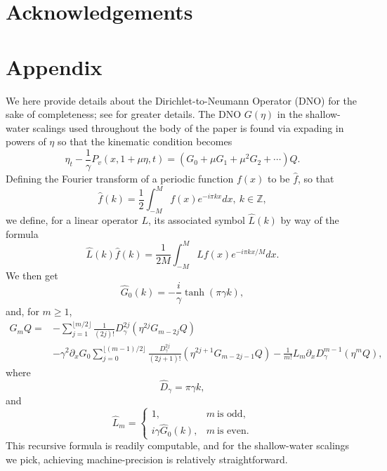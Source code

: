 \documentclass[a4paper,11pt]{article}
\newcommand{\ba}{\begin{array}}
\newcommand{\ea}{\end{array}}
\newcommand{\p}{\partial}
\begin{document}
\section*{Acknowledgements}

\section*{Appendix}
We here provide details about the Dirichlet-to-Neumann Operator (DNO) for the sake of completeness; see \cite{craig,guyenne} for greater details.    The DNO $G(\eta)$ in the shallow-water scalings used throughout the body of the paper is found via expading in powers of $\eta$ so that the kinematic condition becomes 
\[
\eta_{t} - \frac{1}{\gamma}P_{v}(x,1+\mu \eta,t) = \left(G_{0} + \mu G_{1} + \mu^{2}  G_{2} + \cdots \right)Q.
\]
Defining the Fourier transform of a periodic function $f(x)$ to be $\hat{f}$, so that 
\[
\hat{f}(k) = \frac{1}{2}\int_{-M}^{M}f(x)e^{-i\pi k x} dx, ~ k\in \mathbb{Z},
\]
we define, for a linear operator $L$, its associated symbol $\hat{L}(k)$ by way of the formula 
\[
\hat{L}(k)\hat{f}(k) = \frac{1}{2M}\int_{-M}^{M} Lf(x) e^{-i\pi k x/M}dx.
\]
We then get 
\[
\hat{G}_{0}(k) = -\frac{i}{\gamma}\tanh(\pi \gamma k),
\]
and, for $m\geq 1$, 
\begin{align*}
G_{m}Q = & -\sum_{j=1}^{\lfloor{m/2}\rfloor}\frac{1}{(2j)!}D^{2j}_{\gamma}\left(\eta^{2j}G_{m-2j}Q\right) \\
& - \gamma^{2}\p_{x}G_{0} \sum_{j=0}^{\lfloor{(m-1)/2}\rfloor}\frac{D_{\gamma}^{2j}}{(2j+1)!}\left(\eta^{2j+1}G_{m-2j-1}Q\right) - \frac{1}{m!}L_{m} \p_{x}D_{\gamma}^{m-1}\left(\eta^{m}Q \right),
\end{align*}
where
\[
\hat{D}_{\gamma} = \pi \gamma k,
\]
and
\[
\hat{L}_{m} = \left\{
\ba{rl}
1,  & m~\mbox{is odd}, \\
i\gamma \hat{G}_{0}(k),  & m~\mbox{is even}.
\ea
\right.
\]
This recursive formula is readily computable, and for the shallow-water scalings we pick, achieving machine-precision is relatively straightforward.  


\end{document}
